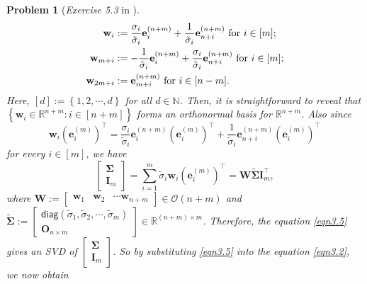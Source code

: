 \documentclass[11pt]{article}
\newtheorem{problem}{Problem}
\begin{document}
\begin{problem} [\emph{Exercise 5.3} in \cite{calafiore2014optimization}]
{\begin{equation}
    \label{eqn3.4}
    \begin{split}
        \mathbf{w}_i &:= \frac{\sigma_i}{\tilde{\sigma}_i} \mathbf{e}_{i}^{(n+m)} + \frac{1}{\tilde{\sigma}_i} \mathbf{e}_{n+i}^{(n+m)} \textnormal{ for } i \in [m]; \\
        \mathbf{w}_{m+i} &:= - \frac{1}{\tilde{\sigma}_i} \mathbf{e}_{i}^{(n+m)} + \frac{\sigma_i}{\tilde{\sigma}_i} \mathbf{e}_{n+i}^{(n+m)} \textnormal{ for } i \in [m]; \\
        \mathbf{w}_{2m+i} &:= \mathbf{e}_{m+i}^{(n+m)} \textnormal{ for } i \in [n-m].
    \end{split}
\end{equation}
Here, $[d] := \left\{ 1, 2, \cdots, d \right\}$ for all $d \in \mathbb{N}$. Then, it is straightforward to reveal that $\left\{ \mathbf{w}_i \in \mathbb{R}^{n+m}: i \in [n+m] \right\}$ forms an orthonormal basis for $\mathbb{R}^{n+m}$. Also since
\begin{equation*}
    \mathbf{w}_i \left( \mathbf{e}_{i}^{(m)} \right)^{\top} = \frac{\sigma_i}{\tilde{\sigma}_i} \mathbf{e}_{i}^{(n+m)} \left( \mathbf{e}_{i}^{(m)} \right)^{\top} + \frac{1}{\tilde{\sigma}_i} \mathbf{e}_{n+i}^{(n+m)} \left( \mathbf{e}_{i}^{(m)} \right)^{\top}
\end{equation*}
for every $i \in [m]$, we have
\begin{equation}
    \label{eqn3.5}
    \begin{bmatrix} \mathbf{\Sigma} \\ \mathbf{I}_m \end{bmatrix}
    = \sum_{i=1}^{m} \tilde{\sigma}_i \mathbf{w}_i \left( \mathbf{e}_{i}^{(m)} \right)^{\top}
    = \mathbf{W} \tilde{\mathbf{\Sigma}} \mathbf{I}_{m}^{\top},
\end{equation}
where $\mathbf{W} := \begin{bmatrix} \mathbf{w}_1 & \mathbf{w}_2 & \cdots \mathbf{w}_{n+m} \end{bmatrix} \in \mathcal{O}(n+m)$ and $\tilde{\mathbf{\Sigma}} := \begin{bmatrix} \textsf{diag} \left( \tilde{\sigma}_1, \tilde{\sigma}_2, \cdots, \tilde{\sigma}_m \right) \\ \mathbf{O}_{n \times m} \end{bmatrix} \in \mathbb{R}^{(n+m) \times m}$. Therefore, the equation \eqref{eqn3.5} gives an \textsf{SVD} of $\begin{bmatrix} \mathbf{\Sigma} \\ \mathbf{I}_m \end{bmatrix}$. So by substituting \eqref{eqn3.5} into the equation \eqref{eqn3.2}, we now obtain
}
\end{problem}
\end{document}
